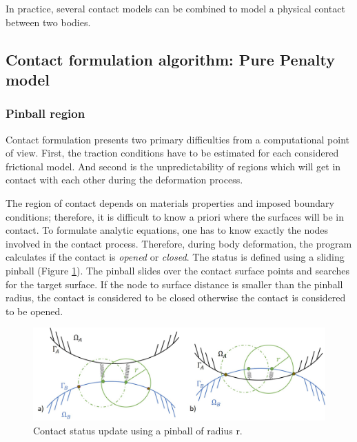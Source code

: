 In practice, several contact models can be combined to model a physical contact between two bodies.   

\subsection{Contact formulation algorithm: Pure Penalty model}%

\subsubsection*{Pinball region}

Contact formulation presents two primary difficulties from a computational point of view. First, the traction conditions have to be estimated for each considered frictional model. And second is the unpredictability of regions which will get in contact with each other during the deformation process.

The region of contact depends on materials properties and imposed boundary conditions; therefore, it is difficult to know a priori where the surfaces will be in contact. To formulate analytic equations, one has to know exactly the nodes involved in the contact process. Therefore, during body deformation, the program calculates if the contact is \textit{opened} or \textit{closed}. The status is defined using a sliding pinball (Figure \ref{pinball}). The pinball slides over the contact surface points and searches for the target surface. If the node to surface distance is smaller than the pinball radius, the contact is considered to be closed otherwise the contact is considered to be opened.   

 \begin{center}
\begin{figure}
\centerline{\includegraphics[width=1\textwidth,keepaspectratio]{figures/pinball.jpg} }
\caption{Contact status update using a pinball of radius r.}
\label{pinball}
\end{figure}
\end{center}
 
